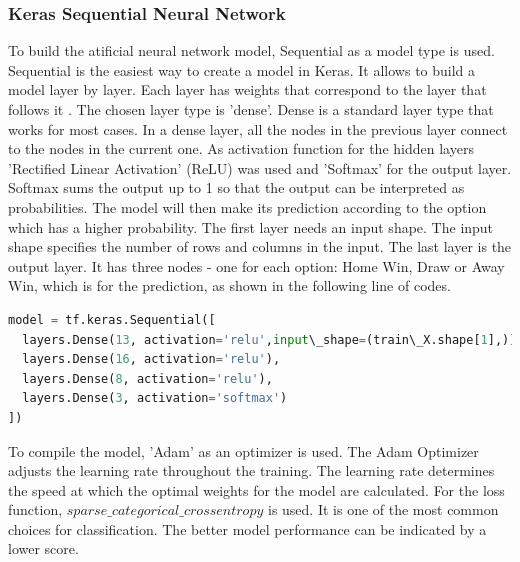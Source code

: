 \subsubsection{Keras Sequential Neural Network}

To build the atificial neural network model, Sequential as a model type is used. Sequential is the easiest way to create a model in Keras. It allows to build a model layer by layer. Each layer has weights that correspond to the layer that follows it \cite{buildingDLModel}.\newline
The chosen layer type is 'dense'. Dense is a standard layer type that works for most cases. In a dense layer, all the nodes in the previous layer connect to the nodes in the current one.\newline
As activation function for the hidden layers 'Rectified Linear Activation' (ReLU) was used and 'Softmax' for the output layer. Softmax sums the output up to 1 so that the output can be interpreted as probabilities. The model will then make its prediction according to the option which has a higher probability.\newline \newline
The first layer needs an input shape. The input shape specifies the number of rows and columns in the input.\newline
The last layer is the output layer. It has three nodes - one for each option: Home Win, Draw or Away Win, which is for the prediction, as shown in the following line of codes.\newline \newline
\begin{lstlisting}[language=Python, caption=Python code for simple Keras Sequantial Model Instantiation]
model = tf.keras.Sequential([ 
  layers.Dense(13, activation='relu',input\_shape=(train\_X.shape[1],)), 
  layers.Dense(16, activation='relu'),
  layers.Dense(8, activation='relu'),
  layers.Dense(3, activation='softmax')
])
\end{lstlisting}
To compile the model, 'Adam' as an optimizer is used. The Adam Optimizer adjusts the learning rate throughout the training.\newline
The learning rate determines the speed at which the optimal weights for the model are calculated.\newline
For the loss function, $sparse\_categorical\_crossentropy$ is used. It is one of the most common choices for classification. The better model performance can be indicated by a lower score.\newline \newline

